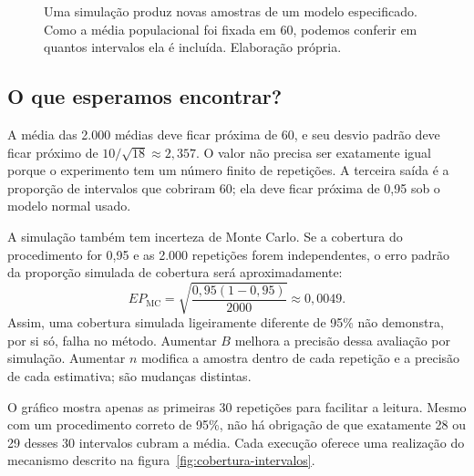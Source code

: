 \begin{figure}[H]
\centering
{}
\caption{Uma simulação produz novas amostras de um modelo especificado. Como a média populacional foi fixada em 60, podemos conferir em quantos intervalos ela é incluída. Elaboração própria.}
\label{fig:simulacao-intervalos}
\end{figure}

\subsection{O que esperamos encontrar?}

A média das 2.000 médias deve ficar próxima de 60, e seu desvio padrão deve ficar próximo de $10/\sqrt{18}\approx2{,}357$. O valor não precisa ser exatamente igual porque o experimento tem um número finito de repetições. A terceira saída é a proporção de intervalos que cobriram 60; ela deve ficar próxima de 0,95 sob o modelo normal usado.

A simulação também tem incerteza de Monte Carlo. Se a cobertura do procedimento for 0,95 e as 2.000 repetições forem independentes, o erro padrão da proporção simulada de cobertura será aproximadamente:
\[
EP_{\mathrm{MC}}=\sqrt{\frac{0{,}95(1-0{,}95)}{2000}}
\approx0{,}0049.
\]
Assim, uma cobertura simulada ligeiramente diferente de 95\% não demonstra, por si só, falha no método. Aumentar $B$ melhora a precisão dessa avaliação por simulação. Aumentar $n$ modifica a amostra dentro de cada repetição e a precisão de cada estimativa; são mudanças distintas.

O gráfico mostra apenas as primeiras 30 repetições para facilitar a leitura. Mesmo com um procedimento correto de 95\%, não há obrigação de que exatamente 28 ou 29 desses 30 intervalos cubram a média. Cada execução oferece uma realização do mecanismo descrito na figura~\ref{fig:cobertura-intervalos}.

